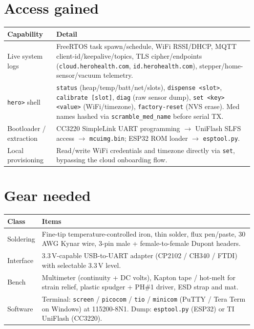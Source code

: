 \documentclass[10pt]{article}
\begin{document}
\section{Access gained}

\begin{center}\scriptsize
\begin{tabular}{|L{1.4in}|L{4.6in}|}
\hline
\textbf{Capability} & \textbf{Detail} \\
\hline
Live system logs & FreeRTOS task spawn/schedule, WiFi RSSI/DHCP, MQTT client-id/keepalive/topics, TLS cipher/endpoints (\texttt{cloud.herohealth.com}, \texttt{id.herohealth.com}), stepper/home-sensor/vacuum telemetry. \\
\hline
\texttt{hero>} shell & \texttt{status} (heap/temp/batt/net/slots), \texttt{dispense <slot>}, \texttt{calibrate [slot]}, \texttt{diag} (raw sensor dump), \texttt{set <key> <value>} (WiFi/timezone), \texttt{factory-reset} (NVS erase). Med names hashed via \texttt{scramble\_med\_name} before serial TX. \\
\hline
Bootloader / extraction & CC3220 SimpleLink UART programming $\rightarrow$ UniFlash SLFS access $\rightarrow$ \texttt{mcuimg.bin}; ESP32 ROM loader $\rightarrow$ \texttt{esptool.py}. \\
\hline
Local provisioning & Read/write WiFi credentials and timezone directly via \texttt{set}, bypassing the cloud onboarding flow. \\
\hline
\end{tabular}
\end{center}

\section{Gear needed}

\begin{center}\scriptsize
\begin{tabular}{|L{1.05in}|L{4.95in}|}
\hline
\textbf{Class} & \textbf{Items} \\
\hline
Soldering & Fine-tip temperature-controlled iron, thin solder, flux pen/paste, 30\,AWG Kynar wire, 3-pin male + female-to-female Dupont headers. \\
\hline
Interface & 3.3\,V-capable USB-to-UART adapter (CP2102 / CH340 / FTDI) with selectable 3.3\,V level. \\
\hline
Bench & Multimeter (continuity + DC volts), Kapton tape / hot-melt for strain relief, plastic spudger + PH\#1 driver, ESD strap and mat. \\
\hline
Software & Terminal: \texttt{screen} / \texttt{picocom} / \texttt{tio} / \texttt{minicom} (PuTTY / Tera Term on Windows) at 115200-8N1. Dump: \texttt{esptool.py} (ESP32) or TI UniFlash (CC3220). \\
\hline
\end{tabular}
\end{center}
\end{document}
